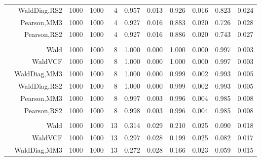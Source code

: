 \documentclass[
]{article}
\begin{document}
\begin{table}[H]
{\begin{tabular}[t]{lrrrrrrrlrr}
\hspace{1em} & WaldDiag,RS2 & 1000 & 1000 & 4 & 0.957 & 0.013 & 0.926 & 0.016 & 0.823 & 0.024\\

\hspace{1em} & Pearson,MM3 & 1000 & 1000 & 4 & 0.927 & 0.016 & 0.883 & 0.020 & 0.726 & 0.028\\

\hspace{1em} & Pearson,RS2 & 1000 & 1000 & 4 & 0.927 & 0.016 & 0.886 & 0.020 & 0.743 & 0.027\\
\cmidrule{1-11}
\addlinespace[0.3em]
\multicolumn{11}{l}{\textbf{1F 15V}}\\
\hspace{1em} & Wald & 1000 & 1000 & 8 & 1.000 & 0.000 & 1.000 & 0.000 & 0.997 & 0.003\\

\hspace{1em} & WaldVCF & 1000 & 1000 & 8 & 1.000 & 0.000 & 1.000 & 0.000 & 0.997 & 0.003\\

\hspace{1em} & WaldDiag,MM3 & 1000 & 1000 & 8 & 1.000 & 0.000 & 0.999 & 0.002 & 0.993 & 0.005\\

\hspace{1em} & WaldDiag,RS2 & 1000 & 1000 & 8 & 1.000 & 0.000 & 0.999 & 0.002 & 0.993 & 0.005\\

\hspace{1em} & Pearson,MM3 & 1000 & 1000 & 8 & 0.997 & 0.003 & 0.996 & 0.004 & 0.985 & 0.008\\

\hspace{1em} & Pearson,RS2 & 1000 & 1000 & 8 & 0.998 & 0.003 & 0.996 & 0.004 & 0.985 & 0.008\\
\cmidrule{1-11}
\addlinespace[0.3em]
\multicolumn{11}{l}{\textbf{2F 10V}}\\
\hspace{1em} & Wald & 1000 & 1000 & 13 & 0.314 & 0.029 & 0.210 & 0.025 & 0.090 & 0.018\\

\hspace{1em} & WaldVCF & 1000 & 1000 & 13 & 0.297 & 0.028 & 0.199 & 0.025 & 0.082 & 0.017\\

\hspace{1em} & WaldDiag,MM3 & 1000 & 1000 & 13 & 0.272 & 0.028 & 0.166 & 0.023 & 0.059 & 0.015\\


\end{tabular}}
\end{table}
\end{document}
